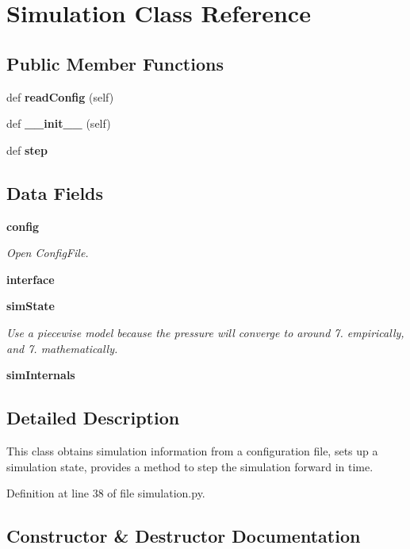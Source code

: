 \section{Simulation Class Reference}
\label{classsims_1_1tcppipe_1_1simulation_1_1_simulation}
\subsection*{Public Member Functions}
\begin{DoxyCompactItemize}
\item 
def {\bf read\+Config} (self)
\item 
def {\bf \+\_\+\+\_\+init\+\_\+\+\_\+} (self)
\item 
def {\bf step}
\end{DoxyCompactItemize}
\subsection*{Data Fields}
\begin{DoxyCompactItemize}
\item 
{\bf config}
\begin{DoxyCompactList}\small\item\em Open Config\+File. \end{DoxyCompactList}\item 
{\bf interface}
\item 
{\bf sim\+State}
\begin{DoxyCompactList}\small\item\em Use a piecewise model because the pressure will converge to around 7. empirically, and 7. mathematically. \end{DoxyCompactList}\item 
{\bf sim\+Internals}
\end{DoxyCompactItemize}


\subsection{Detailed Description}
\begin{DoxyVerb}This class obtains simulation information from a configuration file,
    sets up a simulation state, provides a method to step the simulation
    forward in time.\end{DoxyVerb}
 

Definition at line 38 of file simulation.\+py.



\subsection{Constructor \& Destructor Documentation}
